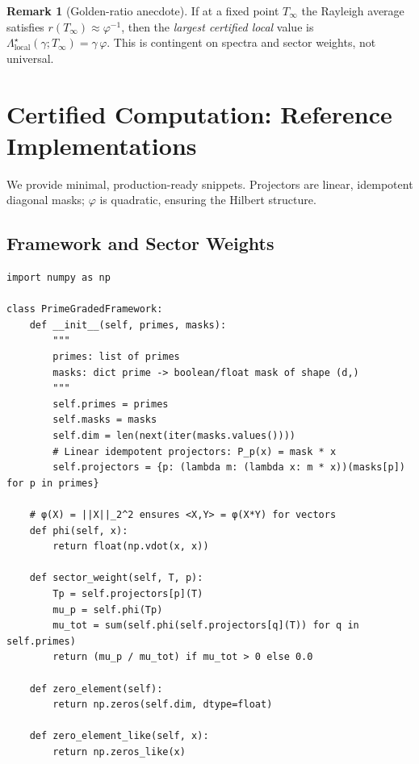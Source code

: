 \documentclass[11pt]{article}
\newcommand{\Llocal}{\Lambda_{\mathrm{local}}}
\newcommand{\PGstate}{\varphi}
\theoremstyle{definition}
\newtheorem{remark}[theorem]{Remark}
\begin{document}
\begin{remark}[Golden-ratio anecdote]
If at a fixed point $T_\infty$ the Rayleigh average satisfies $r(T_\infty)\approx\varphi^{-1}$, then the \emph{largest certified local} value is $\Llocal^\star(\gamma;T_\infty)=\gamma\,\varphi$. This is contingent on spectra and sector weights, not universal.
\end{remark}

\section{Certified Computation: Reference Implementations}
We provide minimal, production-ready snippets. Projectors are linear, idempotent diagonal masks; $\PGstate$ is quadratic, ensuring the Hilbert structure.

\subsection{Framework and Sector Weights}
\begin{lstlisting}[style=py,caption={PrimeGradedFramework with linear idempotent projectors and quadratic state},label={lst:framework}]
import numpy as np

class PrimeGradedFramework:
    def __init__(self, primes, masks):
        """
        primes: list of primes
        masks: dict prime -> boolean/float mask of shape (d,)
        """
        self.primes = primes
        self.masks = masks
        self.dim = len(next(iter(masks.values())))
        # Linear idempotent projectors: P_p(x) = mask * x
        self.projectors = {p: (lambda m: (lambda x: m * x))(masks[p]) for p in primes}

    # φ(X) = ||X||_2^2 ensures <X,Y> = φ(X*Y) for vectors
    def phi(self, x):
        return float(np.vdot(x, x))

    def sector_weight(self, T, p):
        Tp = self.projectors[p](T)
        mu_p = self.phi(Tp)
        mu_tot = sum(self.phi(self.projectors[q](T)) for q in self.primes)
        return (mu_p / mu_tot) if mu_tot > 0 else 0.0

    def zero_element(self):
        return np.zeros(self.dim, dtype=float)

    def zero_element_like(self, x):
        return np.zeros_like(x)
\end{lstlisting}
\end{document}
